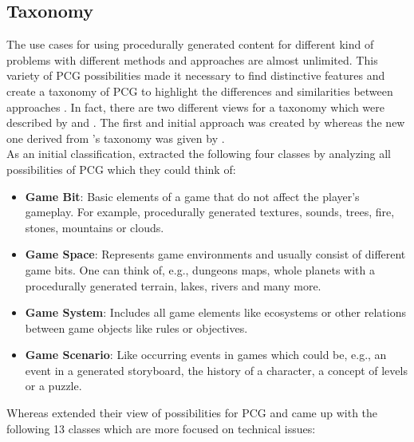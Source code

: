\documentclass[MGS,Master,english]{twbook}%
\begin{document}
\subsection{Taxonomy}\label{PcgTaxonomy}
The use cases for using procedurally generated content for different kind of problems with different methods and approaches are almost unlimited. This variety of PCG possibilities made it necessary to find distinctive features and create a taxonomy of PCG to highlight the differences and similarities between approaches \cite{pcg::book}. In fact, there are two different views for a taxonomy which were described by \cite{pcg::survey} and \cite{pcg::book}. The first and initial approach was created by \cite{pcg::survey} whereas the new one derived from \cite{pcg::survey}'s taxonomy was given by \cite{pcg::book}.\\
As an initial classification, \cite{pcg::survey} extracted the following four classes by analyzing all possibilities of PCG which they could think of:
\begin{itemize}
	\item \textbf{Game Bit}: Basic elements of a game that do not affect the player's gameplay. For example, procedurally generated textures, sounds, trees, fire, stones, mountains or clouds. \cite{pcg::survey}
	\item \textbf{Game Space}: Represents game environments and usually consist of different game bits. One can think of, e.g., dungeons maps, whole planets with a procedurally generated terrain, lakes, rivers and many more. \cite{pcg::survey}
	\item \textbf{Game System}: Includes all game elements like ecosystems or other relations between game objects like rules or objectives. \cite{pcg::survey}
	\item \textbf{Game Scenario}: Like occurring events in games which could be, e.g., an event in a generated storyboard, the history of a character, a concept of levels or a puzzle. \cite{pcg::survey}
\end{itemize}
Whereas \cite{pcg::book} extended their view of possibilities for PCG and came up with the following 13 classes which are more focused on technical issues:
\end{document}
